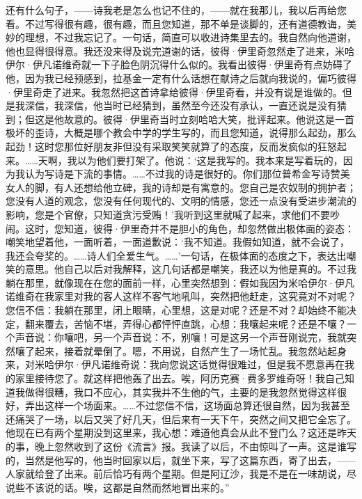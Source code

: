 \par 还有什么句子，——诗我老是怎么也记不住的，——就在我那儿，我以后再给您看。不过写得很有趣，很有趣，而且您知道，那不单是谈脚的，还有道德教诲，美妙的理想，不过我忘记了。一句话，简直可以收进诗集里去的。我自然向他道谢，他也显得很得意。我还没来得及说完道谢的话，彼得·伊里奇忽然走了进来，米哈伊尔·伊凡诺维奇就一下子脸色阴沉得什么似的。我看出彼得·伊里奇有点妨碍了他，因为我已经预感到，拉基金一定有什么话想在献诗之后就向我说的，偏巧彼得·伊里奇走了进来。我忽然把这首诗拿给彼得·伊里奇看，并没有说是谁做的。但是我深信，我深信，他当时已经猜到，虽然至今还没有承认，一直还说是没有猜到；但这是他故意的。彼得·伊里奇当时立刻哈哈大笑，批评起来。他说这是一首极坏的歪诗，大概是哪个教会中学的学生写的，而且您知道，说得那么起劲，那么起劲！这时您那位好朋友非但没有采取笑笑就算了的态度，反而发疯似的狂怒起来。……天啊，我以为他们要打架了。他说：‘这是我写的。我本来是写着玩的，因为我认为写诗是下流的事情。……不过我的诗是很好的。你们那位普希金写诗赞美女人的脚，有人还想给他立碑，我的诗却是有寓意的。您自己是农奴制的拥护者；您没有人道的观念，您没有任何现代的、文明的情感，您还一点没有受进步潮流的影响，您是个官僚，只知道贪污受贿！’我听到这里就喊了起来，求他们不要吵闹。这时，您知道，彼得·伊里奇并不是胆小的角色，却忽然做出极体面的姿态：嘲笑地望着他，一面听着，一面道歉说：‘我不知道。我假如知道，就不会说了，我还会夸奖的。……诗人们全爱生气。……’一句话，在极体面的态度之下，表达出嘲笑的意思。他自己以后对我解释，这几句话都是嘲笑，我还以为他是真的。不过我躺在那里，就像现在在您的面前一样，心里突然想到：假如我因为米哈伊尔·伊凡诺维奇在我家里对我的客人这样不客气地吼叫，突然把他赶走，这究竟对不对呢？您信不信：我躺在那里，闭上眼睛，心里想，这是对呢？还是不对？却始终不能决定，翻来覆去，苦恼不堪，弄得心都怦怦直跳，心想：我嚷起来呢？还是不嚷？一个声音说：你嚷吧，另一个声音说：不，别嚷！可是这另一个声音刚说完，我就突然嚷了起来，接着就晕倒了。嗯，不用说，自然产生了一场忙乱。我忽然站起身来，对米哈伊尔·伊凡诺维奇说：我向您说这话觉得很难过，但是我不愿意再在我的家里接待您了。就这样把他轰了出去。唉，阿历克赛·费多罗维奇呀！我自己知道我做得很糟，我口不应心，其实我并不生他的气，主要的是我忽然觉得这样很好，弄出这样一个场面来。……不过您信不信，这场面总算还很自然，因为我甚至还痛哭了一场，以后又哭了好几天，但后来有一天下午，突然之间又把它全忘了。他现在已有两个星期没到这里来，我心想：难道他真会从此不登门么？这还是昨天的事，晚上忽然收到了这份《流言》报。我读了以后，不由惊叫了一声。这是谁写的，当然是他写的，他当时回家以后，就坐下来，写了这篇东西，寄了出去，——人家就给登了出来。前后恰巧有两个星期。但是阿辽沙，我是不是在一味胡说，尽说些不该说的话。唉，这都是自然而然地冒出来的。”
